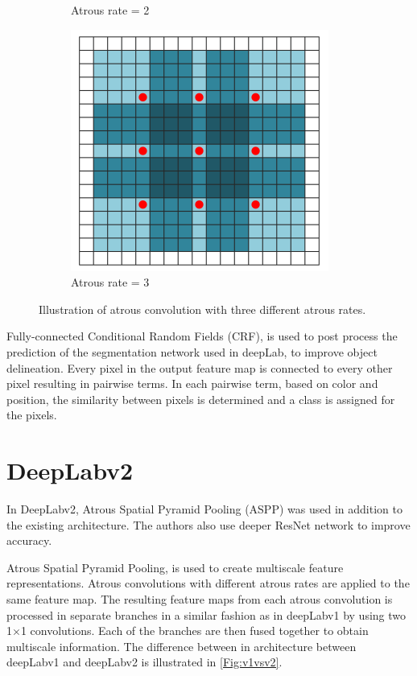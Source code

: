 \begin{figure}
\begin{subfigure}{.3\textwidth}
			\caption{Atrous rate = 2}
		\end{subfigure}
		\begin{subfigure}{.3\textwidth}
			\centering
			\includegraphics[width=1\linewidth]{images/r_3}
			\caption{Atrous rate = 3}
		\end{subfigure}
		\caption{Illustration of atrous convolution with three different atrous rates.}
		\label{Fig:atconv}
	\end{figure}
	
Fully-connected Conditional Random Fields (CRF), is used to post process the prediction of the segmentation network used in deepLab, to improve object delineation. Every pixel in the output feature map is connected to every other pixel resulting in pairwise terms. In each pairwise term, based on color and position, the similarity between pixels is determined and a class is assigned for the pixels.


\section{DeepLabv2}

In DeepLabv2, Atrous Spatial Pyramid Pooling (ASPP) was used in addition to the existing architecture. The authors also use deeper ResNet network to improve accuracy.

Atrous Spatial Pyramid Pooling, is used to create multiscale feature representations. Atrous convolutions with different atrous rates are applied to the same feature map. The resulting feature maps from each atrous convolution is processed in separate branches in a similar fashion as in deepLabv1 by using two 1$\times$1 convolutions. Each of the branches are then fused together to obtain multiscale information. The difference between in architecture between deepLabv1 and deepLabv2 is illustrated in \ref{Fig:v1vsv2}.


